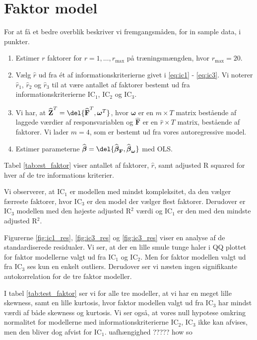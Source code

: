 \clearpage
\section{Faktor model}
For at få et bedre overblik beskriver vi fremgangsmåden, for in sample data, i punkter. 
\begin{enumerate}
\item Estimer $r$ faktorer for $r = 1, \dots, r_{\max}$ på træningsmængden, hvor $r_{\max} = 20$.  
\item Vælg $\widehat{r}$ ud fra ét af informationskriterierne givet i \eqref{eq:ic1} -  \eqref{eq:ic3}. Vi noterer $\widehat{r}_1$, $\widehat{r}_2$ og $\widehat{r}_3$ til at være antallet af faktorer bestemt ud fra informationskriterierne IC$_1$, IC$_2$ og IC$_3$.
\item Vi har, at $\widehat{\textbf{Z}}^T = \del{\widehat{{\textbf{F}}}^T, \boldsymbol{\omega}^T}$, hvor $ \boldsymbol{\omega}$ er en $m \times T $ matrix bestående af laggede værdier af responsvariablen og $\widehat{\textbf{F}}$ er en $\widehat{r} \times T$ matrix, bestående af faktorer. Vi lader $m = 4$, som er bestemt ud fra vores autoregressive model. 
\item Estimer parameterne $\widehat{\boldsymbol{\beta}} = \del{ \widehat{\boldsymbol{\beta}}_{\textbf{F}}, \widehat{\boldsymbol{\beta}}_{\boldsymbol{\omega}}}$ med OLS.
\end{enumerate}

Tabel \ref{tab:est_faktor} viser antallet af faktorer, $\widehat{r}$, samt adjusted R squared for hver af de tre informations kriterier. 


Vi observerer, at IC$_1$ er modellen med mindst kompleksitet, da den vælger færreste faktorer, hvor IC$_3$ er den model der vælger flest faktorer. Derudover er IC$_3$ modellen med den højeste adjusted R$^2$ værdi og IC$_1$ er den med den mindste adjusted R$^2$.

Figurerne \ref{fig:ic1_res}, \ref{fig:ic3_res} og \ref{fig:ic3_res} viser en analyse af de standardiserede residualer. Vi ser, at der en lille smule tunge haler i QQ plottet for faktor modellerne valgt ud fra IC$_1$ og IC$_2$. Men for faktor modellen valgt ud fra IC$_3$ ses kun en enkelt outliers. 
Derudover ser vi næsten ingen signifikante autokorrelation for de tre faktor modeller. 



I tabel  \ref{tab:test_faktor} ser vi for alle tre modeller, at vi har en meget lille skewness, samt en lille kurtosis, hvor faktor modellen valgt ud fra IC$_3$ har mindst værdi af både skewness og kurtosis. 
Vi ser også, at vores null hypotese omkring normalitet for modellerne med informationskriterierne IC$_2$, IC$_3$ ikke kan afvises, men den bliver dog afvist for IC$_1$. uafhængighed ????? how so 
 

